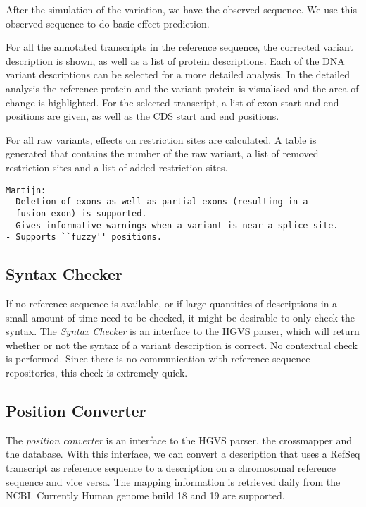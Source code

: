 \documentclass{article}
\begin{document}
After the simulation of the variation, we have the observed sequence. We use
this observed sequence to do basic effect prediction.

For all the annotated transcripts in the reference sequence, the corrected
variant description is shown, as well as a list of protein descriptions. Each
of the DNA variant descriptions can be selected for a more detailed analysis.
In the detailed analysis the reference protein and the variant protein is
visualised and the area of change is highlighted. For the selected transcript,
a list of exon start and end positions are given, as well as the CDS start and
end positions.

For all raw variants, effects on restriction sites are calculated. A table is
generated that contains the number of the raw variant, a list of removed
restriction sites and a list of added restriction sites.

\begin{verbatim}
Martijn:
- Deletion of exons as well as partial exons (resulting in a
  fusion exon) is supported.
- Gives informative warnings when a variant is near a splice site.
- Supports ``fuzzy'' positions.
\end{verbatim}

\subsection{Syntax Checker} \label{subsec:syntaxcheck}
If no reference sequence is available, or if large quantities of
descriptions in a small amount of time need to be checked, it might be
desirable to only check the syntax. The \emph{Syntax Checker} is an interface
to the HGVS parser, which will return whether or not the syntax of a variant
description is correct. No contextual check is performed. Since there is no
communication with reference sequence repositories, this check is extremely
quick.

\subsection{Position Converter} \label{subsec:positionconvert}
The \emph{position converter} is an interface to the HGVS parser, the
cross\-mapper and the database. With this interface, we can convert a
description that uses a RefSeq transcript as reference sequence to a
description on a chromosomal reference sequence and vice versa. The mapping
information is retrieved daily from the NCBI. Currently Human genome build 18
and 19 are supported.
\end{document}
